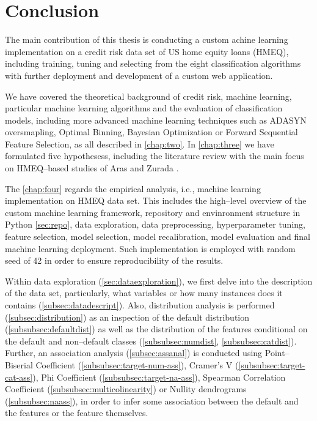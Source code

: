 \chapter{Conclusion}
\label{conclusion}

The main contribution of this thesis is conducting a custom achine learning implementation on a credit risk data set of US home equity loans (HMEQ), including training, tuning and selecting from the eight classification algorithms with further deployment and development of a custom web application.

We have covered the theoretical background of credit risk, machine learning, particular machine learning algorithms and the evaluation of classification models, including more advanced machine learning techniques such as ADASYN oversmapling, Optimal Binning, Bayesian Optimization or Forward Sequential Feature Selection, as all described in \autoref{chap:two}.
In \autoref{chap:three} we have formulated five hypothesess, including the literature review with the main focus on HMEQ--based studies of Aras \citep{serkan2021bagging} and Zurada \citep{zurada2014classification}.


The \autoref{chap:four} regards the empirical analysis, i.e., machine learning implementation on HMEQ data set.  This includes the high--level overview of the custom machine learning framework, repository and envinronment structure in Python \autoref{sec:repo}, data exploration, data preprocessing, hyperparameter tuning, feature selection, model selection, model recalibration, model evaluation and final machine learning deployment.
Such implementation is employed with random seed of 42 in order to ensure reproducibility of the results.

Within data exploration (\autoref{sec:dataexploration}), we first delve into the description of the data set, particularly, what variables or how many instances does it contains (\autoref{subsec:datadescript}).
Also, distribution analysis is performed (\autoref{subsec:distribution}) as an inspection of the default distribution (\autoref{subsubsec:defaultdist}) as well as the distribution of the features conditional on the default and non--default classes (\autoref{subsubsec:numdist}, \autoref{subsubsec:catdist}).
Further, an association analysis (\autoref{subsec:assanal}) is conducted using Point--Biserial Coefficient (\autoref{subsubsec:target-num-ass}),
Cramer's V (\autoref{subsubsec:target-cat-ass}), Phi Coefficient (\autoref{subsubsec:target-na-ass}), Spearman Correlation Coefficient (\autoref{subsubsec:multicolinearity}) or Nullity dendrograms (\autoref{subsubsec:naass}), in order to infer some association between the default and the features or the feature themselves.

